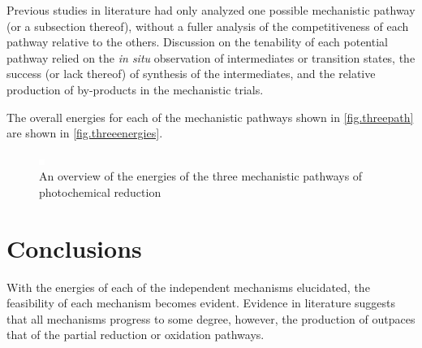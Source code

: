 Previous studies in literature had only analyzed one possible mechanistic pathway (or a subsection thereof), without a fuller analysis of the competitiveness of each pathway relative to the others. Discussion on the tenability of each potential pathway relied on the \textit{in situ} observation of intermediates or transition states, the success (or lack thereof) of synthesis of the intermediates, and the relative production of by-products in the mechanistic trials.

The overall energies for each of the mechanistic pathways shown in \autoref{fig.threepath} are shown in \autoref{fig.threeenergies}. 


\begin{figure}[!htbp]
 \begin{center}
  \includegraphics[clip=true]{images/insertgraphic.eps}
 \end{center}
\caption[Reaction energies for three mechanistic pathways]{An overview of the energies of the three mechanistic pathways of photochemical  reduction}
\label{fig.threeenergies}
\end{figure} 

\section{Conclusions} 

With the energies of each of the independent mechanisms elucidated, the feasibility of each mechanism becomes evident. Evidence in literature suggests that all mechanisms progress to some degree, however, the production of  outpaces that of the partial reduction or oxidation pathways. 
